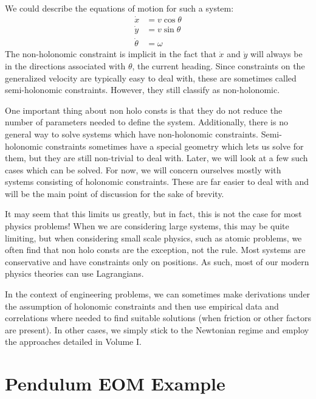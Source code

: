 We could describe the equations of motion for such a system:
\begin{align}
    \dot{x}&=v\cos\theta\\
    \dot{y}&=v\sin\theta\\
    \dot{\theta}&=\omega
\end{align}
The non-holonomic constraint is implicit in the fact that $\dot{x}$ and $\dot{y}$ will always be in the directions associated with $\theta$, the current heading. Since constraints on the generalized velocity are typically easy to deal with, these are sometimes called semi-holonomic constraints. However, they still classify as non-holonomic.

One important thing about \glspl{non holo const} is that they do not reduce the number of parameters needed to define the system. Additionally, there is no general way to solve systems which have non-holonomic constraints. Semi-holonomic constraints sometimes have a special geometry which lets us solve for them, but they are still non-trivial to deal with. Later, we will look at a few such cases which can be solved. For now, we will concern ourselves mostly with systems consisting of holonomic constraints. These are far easier to deal with and will be the main point of discussion for the sake of brevity.

It may seem that this limits us greatly, but in fact, this is not the case for most physics problems! When we are considering large systems, this may be quite limiting, but when considering small scale physics, such as atomic problems, we often find that \glspl{non holo const} are the exception, not the rule. Most systems are conservative and have constraints only on positions. As such, most of our modern physics theories can use \glspl{Lagrangian}.

In the context of engineering problems, we can sometimes make derivations under the assumption of holonomic constraints and then use empirical data and correlations where needed to find suitable solutions (when friction or other factors are present). In other cases, we simply stick to the Newtonian regime and employ the approaches detailed in Volume I.


\section{Pendulum EOM Example}

